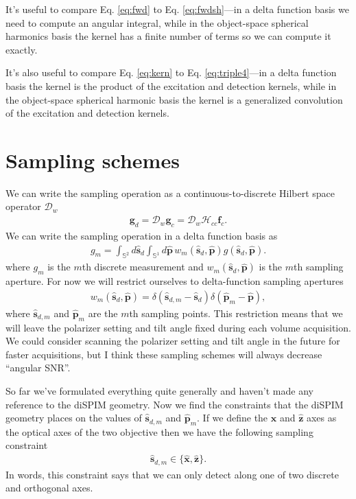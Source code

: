 \documentclass[11pt]{article}
\providecommand{\mb}[1]{\mathbf{#1}}
\providecommand{\mc}[1]{\mathcal{#1}}
\providecommand{\sd}{\mathbf{\hat{s}}_d}
\providecommand{\pp}{\mathbf{\hat{p}}}
\providecommand{\mh}[1]{\mathbf{\hat{#1}}}
\providecommand{\mbb}[1]{\mathbb{#1}}
\begin{document}
It's useful to compare Eq. \eqref{eq:fwd} to Eq. \eqref{eq:fwdsh}---in a delta
function basis we need to compute an angular integral, while in the object-space
spherical harmonics basis the kernel has a finite number of terms so we can
compute it exactly. 

It's also useful to compare Eq. \eqref{eq:kern} to Eq. \eqref{eq:triple4}---in a
delta function basis the kernel is the product of the excitation and detection
kernels, while in the object-space spherical harmonic basis the kernel is a
generalized convolution of the excitation and detection kernels.

\section{Sampling schemes}
We can write the sampling operation as a continuous-to-discrete Hilbert space
operator $\mc{D}_w$
\begin{align}
  \mb{g}_d = \mc{D}_w\mb{g}_c = \mc{D}_w\mc{H}_{cc}\mb{f}_c. 
\end{align}
We can write the sampling operation in a delta function basis as
\begin{align}
  g_m = \int_{\mbb{S}^2}d\sd\int_{\mbb{S}^1}d\pp\, w_m(\sd,\pp)g(\sd,\pp).
\end{align}
where $g_m$ is the $m$th discrete measurement and $w_m(\sd,\pp)$ is the $m$th
sampling aperture. For now we will restrict ourselves to delta-function sampling
apertures
\begin{align}
  w_m(\sd,\pp) = \delta(\mh{s}_{d,m} - \sd)\delta(\mh{p}_{m} - \pp),
\end{align}
where $\mh{s}_{d,m}$ and $\mh{p}_{m}$ are the $m$th sampling points. This
restriction means that we will leave the polarizer setting and tilt angle fixed
during each volume acquisition. We could consider scanning the polarizer
setting and tilt angle in the future for faster acquisitions, but I think these
sampling schemes will always decrease ``angular SNR''.

So far we've formulated everything quite generally and haven't made any
reference to the diSPIM geometry. Now we find the constraints that the diSPIM
geometry places on the values of $\mh{s}_{d,m}$ and $\mh{p}_{m}$. If we define
the $\mh{x}$ and $\mh{z}$ axes as the optical axes of the two objective then we
have the following sampling constraint
\begin{align}
\mh{s}_{d,m} \in \{\mh{x}, \mh{z}\}.  \label{eq:first}
\end{align}
In words, this constraint says that we can only detect along one of two discrete
and orthogonal axes.
\end{document}
